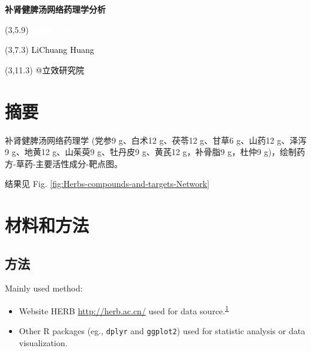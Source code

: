 \documentclass[
]{article}
\author{}
\date{\vspace{-2.5em}}
\providecommand{\tightlist}{%
  \setlength{\itemsep}{0pt}\setlength{\parskip}{0pt}}
\begin{document}
\begin{titlepage} 
\begin{center} \textbf{\Huge
补肾健脾汤网络药理学分析} \vspace{4em}
\begin{textblock}{10}(3,5.9) \huge
\textbf{\textcolor{white}{2023-12-07}}
\end{textblock} \begin{textblock}{10}(3,7.3)
\Large \textcolor{black}{LiChuang Huang}
\end{textblock} \begin{textblock}{10}(3,11.3)
\Large \textcolor{black}{@立效研究院}
\end{textblock} \end{center} \end{titlepage}
\restoregeometry


\tableofcontents

\listoffigures

\listoftables

\newpage


\hypertarget{abstract}{%
\section{摘要}\label{abstract}}

补肾健脾汤网络药理学 (党参9 g、白术12 g、茯苓12 g、甘草6 g、山药12 g、泽泻9 g、地黄12 g、山茱萸9 g、牡丹皮9 g、黄芪12 g，补骨脂9 g，杜仲9 g)，绘制药方-草药-主要活性成分-靶点图。

结果见 Fig. \ref{fig:Herbs-compounds-and-targets-Network}

\hypertarget{methods}{%
\section{材料和方法}\label{methods}}

\hypertarget{ux65b9ux6cd5}{%
\subsection{方法}\label{ux65b9ux6cd5}}

Mainly used method:

\begin{itemize}
\tightlist
\item
  Website HERB \url{http://herb.ac.cn/} used for data source.\textsuperscript{\protect\hyperlink{ref-HerbAHighThFang2021}{1}}
\item
  Other R packages (eg., \texttt{dplyr} and \texttt{ggplot2}) used for statistic analysis or data visualization.
\end{itemize}
\end{document}
